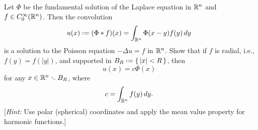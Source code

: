 \begin{problem}
  Let \(\Phi\) be the fundamental solution of the Laplace equation in
  \(\mathbb{R}^n\) and \(f\in C_0^\infty(\mathbb{R}^n)\). Then the convolution
  \[
    u(x)\defeq(\Phi* f)(x)=\int_{\bbR^n}\Phi(x-y)f(y)\diff y
  \]
  is a solution to the Poisson equation \(-\Delta u=f\) in \(\mathbb{R}^n\). Show
  that if \(f\) is radial, i.e., \(f(y)=f(|y|)\), and supported in
  \(B_R\defeq\{\,|x|<R\,\}\), then
  \[
    u(x)=c\Phi(x)
  \]
  for any \(x\in\mathbb{R}^n\smallsetminus B_R\), where
  \[
    c=\int_{\mathbb{R}^n}f(y)\mathop{}\!d y.
  \]
  [\emph{Hint:} Use polar (spherical) coordinates and apply the mean value
  property for harmonic functions.]
\end{problem}
\begin{solution*}
\end{solution*}

